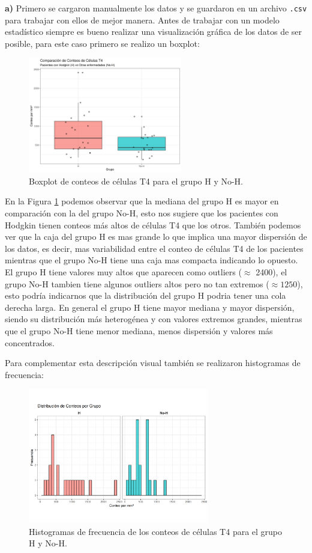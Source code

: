 \textbf{a)} Primero se cargaron manualmente los datos y se guardaron en un archivo \texttt{.csv} para trabajar con ellos de mejor manera. Antes de trabajar con un modelo estadístico siempre es bueno realizar una visualización gráfica de los datos de ser posible, para este caso primero se realizo un boxplot: 

\begin{figure}[H]
    \centering
    \includegraphics[width=0.6\textwidth]{images/boxplot_comparativo.png}
    \caption{Boxplot de conteos de células T4 para el grupo H y No-H.}
    \label{fig:1}
\end{figure}

En la Figura \ref{fig:1} podemos observar que la mediana del grupo H es mayor en comparación con la del grupo No-H, esto nos sugiere que los pacientes con Hodgkin tienen conteos más altos de células T4 que los otros. También podemos ver que la caja del grupo H es mas grande lo que implica una mayor dispersión de los datos, es decir, mas variabilidad entre el conteo de células T4 de los pacientes mientras que el grupo No-H tiene una caja mas compacta indicando lo opuesto. El grupo H tiene valores muy altos que aparecen como outliers ($\approx$ 2400), el grupo No-H tambien tiene algunos outliers altos pero no tan extremos ($\approx1250$), esto podría indicarnos que la distribución del grupo H podria tener una cola derecha larga. En general el grupo H tiene mayor mediana y mayor dispersión, siendo su distribución más heterogénea y con valores extremos grandes, mientras que el grupo No-H tiene menor mediana, menos dispersión y valores más concentrados.

Para complementar esta descripción visual también se realizaron histogramas de frecuencia:
\begin{figure}[H]
    \centering
    \includegraphics[width=0.7\textwidth]{images/histogramas_comparativos.png}
    \caption{Histogramas de frecuencia de los conteos de células T4 para el grupo H y No-H.}
    \label{fig:2}
\end{figure}

